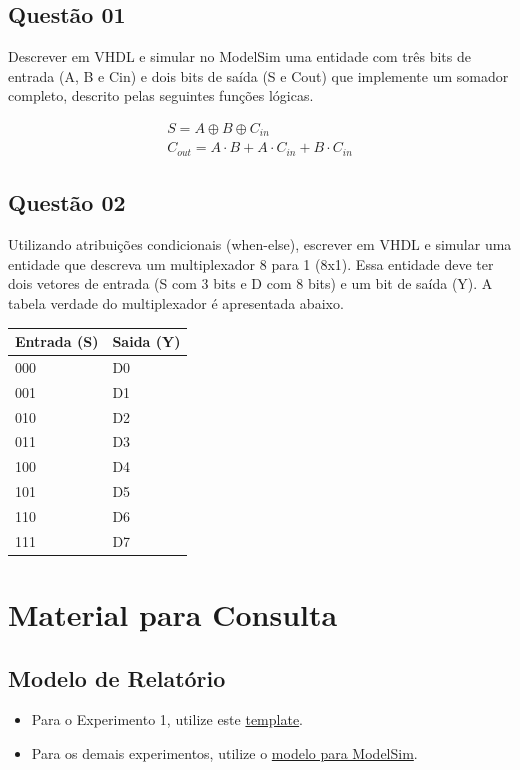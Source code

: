 \documentclass{article}
\begin{document}
\subsection*{Questão 01}
Descrever em VHDL e simular no ModelSim uma entidade com três bits de entrada (A, B e Cin) e dois bits de saída (S e Cout) que implemente um somador completo, descrito pelas seguintes funções lógicas.

\vspace{-0.5cm}
\begin{gather*}
	S = A \oplus B \oplus C_{in} \\
	C_{out} = A \cdot B + A \cdot C_{in} + B \cdot C_{in}
\end{gather*}

\subsection*{Questão 02}
Utilizando atribuições condicionais (when-else), escrever em VHDL e simular uma entidade que descreva um multiplexador 8 para 1 (8x1). Essa entidade deve ter dois vetores de entrada (S com 3 bits e D com 8 bits) e um bit de saída (Y). A tabela verdade do multiplexador é apresentada abaixo.

\vspace{.5cm}
\begin{center}
\begin{tabular}{l l}
\hline
\textbf{Entrada (S)} & \textbf{Saida (Y)} \\
\hline
000 & D0 \\
001 & D1 \\
010 & D2 \\
011 & D3 \\
100 & D4 \\
101 & D5 \\
110 & D6 \\
111 & D7 \\
\hline
\end{tabular}
\end{center}

\newpage





\section*{Material para Consulta}
\subsection*{Modelo de Relatório}
\begin{itemize}
    \item Para o Experimento 1, utilize este \href{link\_do\_modelo\_de\_relatorio\_1}{template}.
    \item Para os demais experimentos, utilize o \href{link\_do\_modelo\_de\_relatorio\_ModelSim}{modelo para ModelSim}.
\end{itemize}
\end{document}
